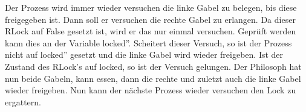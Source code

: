 








Der Prozess wird immer wieder versuchen die linke Gabel zu belegen, bis diese freigegeben ist. Dann soll er versuchen die rechte Gabel zu erlangen. Da dieser RLock auf False gesetzt ist, wird er das nur einmal versuchen. Geprüft werden kann dies an der Variable \glqq locked''. Scheitert dieser Versuch, so ist der Prozess nicht auf \glqq locked'' gesetzt und die linke Gabel wird wieder freigeben. Ist der Zustand des RLock's auf locked, so ist der Versuch gelungen.  Der Philosoph hat nun beide Gabeln, kann essen, dann die rechte und zuletzt auch die linke Gabel wieder freigeben. Nun kann der nächste Prozess wieder versuchen den Lock zu ergattern.
 







